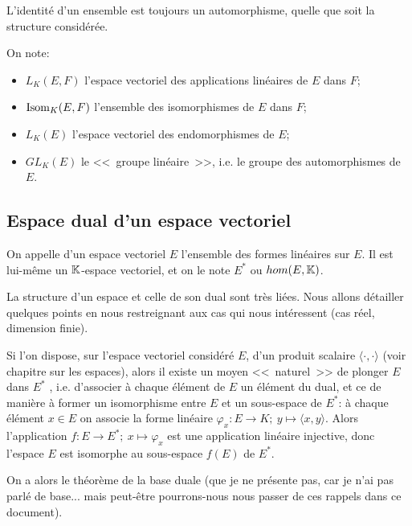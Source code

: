 \medskip
L'identité d'un ensemble est toujours un automorphisme, quelle que soit la structure considérée.

\medskip
On note:
\begin{itemize}
   \item $L_K(E,F)$ l'espace vectoriel des applications linéaires de $E$ dans $F$;
   \item $\operatorname{Isom}_K(E,F)$ l'ensemble des isomorphismes de $E$ dans $F$;
   \item $L_K(E)$ l'espace vectoriel des endomorphismes de $E$;
   \item $GL_K(E)$ le <<~groupe linéaire~>>, i.e. le groupe des automorphismes de $E$.
\end{itemize}

\medskip
\subsection{Espace dual d'un espace vectoriel}

\begin{definition}
On appelle  d'un espace vectoriel $E$ l'ensemble des
formes linéaires sur $E$. Il est lui-même un $\mathbb K$-espace vectoriel, et on le note
$E^*$ ou $hom(E,\mathbb K)$.
\end{definition}

La structure d'un espace et celle de son dual sont très liées.
Nous allons détailler quelques points en nous restreignant aux cas qui nous
intéressent (cas réel, dimension finie).

\medskip
{}
Si l'on dispose, sur l'espace vectoriel considéré $E$, d'un produit scalaire $\langle\cdot,\cdot\rangle$ (voir
chapitre sur les espaces), alors il existe un moyen <<~naturel~>> de plonger $E$ dans $E^*$ ,
i.e. d'associer à chaque élément de $E$ un élément du dual, et ce de manière à
former un isomorphisme entre $E$ et un sous-espace de $E^*$:
à chaque élément $x\in E$ on associe la forme linéaire $\varphi_x : E \to K;\ y \mapsto \langle x,y\rangle$.
Alors l'application $f : E \to E^*;\ x \mapsto \varphi_x$ est une application linéaire injective,
donc l'espace $E$ est isomorphe au sous-espace $f(E)$ de $E^*$.

\medskip
{}
On a alors le théorème de la base duale (que je ne présente pas, car je n'ai pas
parlé de base... mais peut-être pourrons-nous nous passer de ces rappels dans ce
document).

